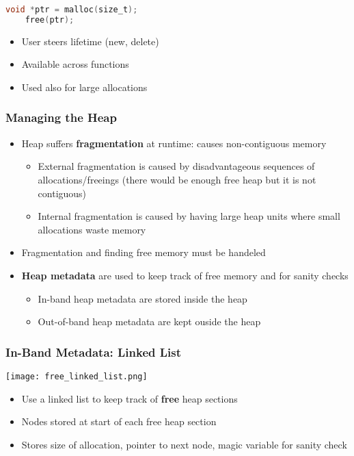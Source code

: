 \begin{lstlisting}[language={C}]
    void *ptr = malloc(size_t);
    free(ptr);                  
\end{lstlisting}
\begin{itemize}
    \item User steers lifetime (new, delete)
    \item Available across functions
    \item Used also for large allocations
\end{itemize}

\subsubsection{Managing the Heap}
\begin{itemize}
    \item Heap suffers \textbf{fragmentation} at runtime: causes non-contiguous memory
          \noindent\begin{itemize}
              \item External fragmentation is caused by disadvantageous sequences of allocations/freeings (there would be enough free heap but it is not contiguous)
              \item Internal fragmentation is caused by having large heap units where small allocations waste memory
          \end{itemize}
    \item Fragmentation and finding free memory must be handeled
    \item \textbf{Heap metadata} are used to keep track of free memory and for sanity checks
          \noindent\begin{itemize}
              \item In-band heap metadata are stored inside the heap
              \item Out-of-band heap metadata are kept ouside the heap
          \end{itemize}
\end{itemize}

\subsubsection{In-Band Metadata: Linked List}
\texttt{[image: free\_linked\_list.png]}

\begin{itemize}
    \item Use a linked list to keep track of \textbf{free} heap sections
    \item Nodes stored at start of each free heap section
    \item Stores size of allocation, pointer to next node, magic variable for sanity check
\end{itemize}

